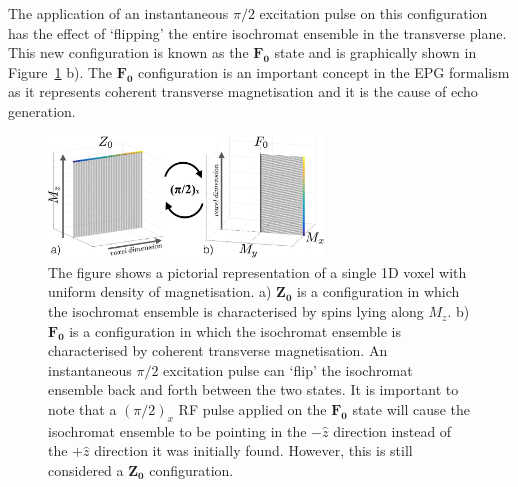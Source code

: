 \hfill

The application of an instantaneous $\pi/2$ excitation pulse on this configuration has the effect of `flipping' the entire isochromat ensemble in the transverse plane.
This new configuration is known as the $\bm{F_0}$ state \cite{Weigel2015} \cite{Scheffler1999} \cite{Hennig1991} and is graphically shown in Figure~\ref{fig:Z0F0states} b).
The $\bm{F_0}$ configuration is an important concept in the EPG formalism as it represents coherent transverse magnetisation and it is the cause of echo generation.
% 
% 

\begin{figure}[H]
    \centering
    \includegraphics[angle=0,width=0.65\textwidth, keepaspectratio]{images/mrf/Z0F0states}
    \caption{The figure shows a pictorial representation of a single 1D voxel with uniform density of magnetisation.
    a) $\bm{Z_0}$ is a configuration in which the isochromat ensemble is characterised by spins lying along $M_z$.
    b) $\bm{F_0}$ is a configuration in which the isochromat ensemble is characterised by coherent transverse magnetisation.
    An instantaneous $\pi/2$ excitation pulse can `flip' the isochromat ensemble back and forth between the two states.
    It is important to note that a $(\pi/2)_x$ RF pulse applied on the $\bm{F_0}$ state will cause the isochromat ensemble to be pointing in the $- \hat{z}$ direction instead of the $+ \hat{z}$ direction it was initially found.
    However, this is still considered a $\bm{Z_0}$ configuration.
    }
    \label{fig:Z0F0states}
\end{figure}


